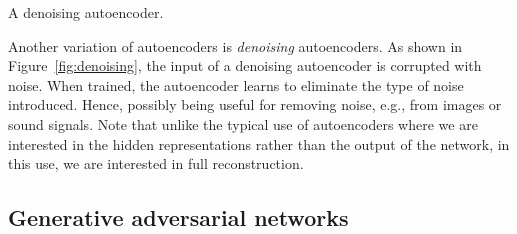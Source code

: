 \begin{marginfigure}
  \centering
      \caption{A denoising autoencoder.}\label{fig:denoising}
\end{marginfigure}
Another variation of autoencoders is \emph{denoising} autoencoders.
As shown in Figure~\ref{fig:denoising},
the input of a denoising autoencoder is corrupted with noise.
When trained,
the autoencoder learns to eliminate the type of noise introduced.
Hence, possibly being useful for removing noise,
e.g., from images or sound signals.
Note that
unlike the typical use of autoencoders where we are interested
in the hidden representations rather than the output of the network,
in this use, we are interested in full reconstruction.


\subsection{Generative adversarial networks}


